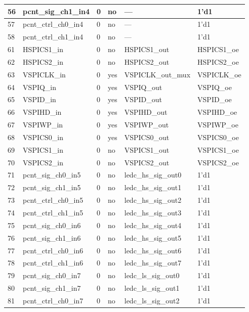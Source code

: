 \begin{longtable}[c]{|p{1cm}|p{3.3cm}|p{1.5cm}|p{2.4cm}|p{4.3cm}|p{2.5cm}| }
    56 & pcnt\_sig\_ch1\_in4 & 0 & no &  --- & 1'd1 \\ \hline
    57 & pcnt\_ctrl\_ch0\_in4 & 0 & no & --- & 1'd1 \\ \hline
    58 & pcnt\_ctrl\_ch1\_in4 & 0 & no & --- & 1'd1 \\ \hline
    61 & HSPICS1\_in & 0 & no & HSPICS1\_out & HSPICS1\_oe \\ \hline
    62 & HSPICS2\_in & 0 & no & HSPICS2\_out & HSPICS2\_oe \\ \hline
    63 & VSPICLK\_in & 0 & yes & VSPICLK\_out\_mux & VSPICLK\_oe \\ \hline
    64 & VSPIQ\_in & 0 & yes & VSPIQ\_out & VSPIQ\_oe \\ \hline
    65 & VSPID\_in & 0 & yes & VSPID\_out & VSPID\_oe \\ \hline
    66 & VSPIHD\_in & 0 & yes & VSPIHD\_out & VSPIHD\_oe \\ \hline
    67 & VSPIWP\_in & 0 & yes & VSPIWP\_out & VSPIWP\_oe \\ \hline
    68 & VSPICS0\_in & 0 & yes & VSPICS0\_out & VSPICS0\_oe \\ \hline
    69 & VSPICS1\_in & 0 & no & VSPICS1\_out & VSPICS1\_oe \\ \hline
    70 & VSPICS2\_in & 0 & no & VSPICS2\_out & VSPICS2\_oe \\ \hline
    71 & pcnt\_sig\_ch0\_in5 & 0 & no & ledc\_hs\_sig\_out0 & 1'd1 \\ \hline
    72 & pcnt\_sig\_ch1\_in5 & 0 & no & ledc\_hs\_sig\_out1 & 1'd1 \\ \hline
    73 & pcnt\_ctrl\_ch0\_in5 & 0 & no & ledc\_hs\_sig\_out2 & 1'd1 \\ \hline
    74 & pcnt\_ctrl\_ch1\_in5 & 0 & no & ledc\_hs\_sig\_out3 & 1'd1 \\ \hline
    75 & pcnt\_sig\_ch0\_in6 & 0 & no & ledc\_hs\_sig\_out4 & 1'd1 \\ \hline
    76 & pcnt\_sig\_ch1\_in6 & 0 & no & ledc\_hs\_sig\_out5 & 1'd1 \\ \hline
    77 & pcnt\_ctrl\_ch0\_in6 & 0 & no & ledc\_hs\_sig\_out6 & 1'd1 \\ \hline
    78 & pcnt\_ctrl\_ch1\_in6 & 0 & no & ledc\_hs\_sig\_out7 & 1'd1 \\ \hline
    79 & pcnt\_sig\_ch0\_in7 & 0 & no & ledc\_ls\_sig\_out0 & 1'd1 \\ \hline
    80 & pcnt\_sig\_ch1\_in7 & 0 & no & ledc\_ls\_sig\_out1 & 1'd1 \\ \hline
    81 & pcnt\_ctrl\_ch0\_in7 & 0 & no & ledc\_ls\_sig\_out2 & 1'd1 \\ \hline

\end{longtable}
